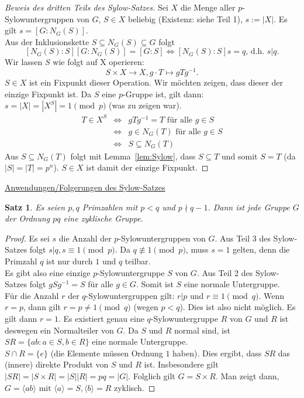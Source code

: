 \documentclass[12pt]{scrartcl}%
\newtheorem{thm}{Satz}
\theoremstyle{definition}
\theoremstyle{remark}
\begin{document}
\begin{proof}[Beweis des dritten Teils des Sylow-Satzes]
	Sei $X$ die Menge aller $p$-Sylowuntergruppen von $G$, $S \in X$ beliebig (Existenz: siehe Teil 1), $s := |X|$. Es gilt $s = [G:N_G(S)]$. \\
	Aus der Inklusionskette $S \subseteq N_G(S) \subseteq G$ folgt
	$$[N_G(S):S] [G:N_G(S)] = [G:S] \Leftrightarrow [N_G(S):S] s = q \text{, d.h. } s | q.$$
	Wir lassen $S$ wie folgt auf X operieren:
	$$S \times X \rightarrow X, g \cdot T \mapsto gTg^{-1}.$$
	$S \in X$ ist ein Fixpunkt dieser Operation. Wir möchten zeigen, dass dieser der einzige Fixpunkt ist. Da $S$ eine $p$-Gruppe ist, gilt dann: $s = |X| = |X^S| = 1 \pmod{p}$ (was zu zeigen war).
	\begin{align*}
		T \in X^S &\Leftrightarrow &gTg^{-1} = T \text{ für alle } g \in S \\
		&\Leftrightarrow &g \in N_G(T) \text{ für alle } g \in S \\
		&\Leftrightarrow &S \subseteq N_G(T)
	\end{align*}
	Aus $S \subseteq N_G(T)$ folgt mit Lemma~\ref{lem:Sylow}, dass $S \subseteq T$ und somit $S = T$ (da $|S| = |T| = p^n$). $S \in X$ ist damit der einzige Fixpunkt.
\end{proof}

\underline{Anwendungen/Folgerungen des Sylow-Satzes}

\begin{thm}
	Es seien $p, q$ Primzahlen mit $p < q$ und $p \nmid q-1$. Dann ist jede Gruppe $G$ der Ordnung $pq$ eine zyklische Gruppe.
\end{thm}

\begin{proof}
	Es sei $s$ die Anzahl der $p$-Sylowuntergruppen von $G$. Aus Teil 3 des Sylow-Satzes folgt $s | q, s \equiv 1 \pmod{p}$. Da $q \not \equiv 1 \pmod{p}$, muss $s = 1$ gelten, denn die Primzahl $q$ ist nur durch $1$ und $q$ teilbar. \\
	Es gibt also eine einzige $p$-Sylowuntergruppe $S$ von $G$. Aus Teil 2 des Sylow-Satzes folgt $gSg^{-1} = S$ für alle $g \in G$. Somit ist $S$ eine normale Untergruppe. \\
	Für die Anzahl $r$ der $q$-Sylowuntergruppen gilt: $r | p$ und $r \equiv 1 \pmod{q}$. Wenn $r = p$, dann gilt $r = p \not = 1 \pmod{q}$ (wegen $p < q$). Dies ist also nicht möglich. Es gilt dann $r = 1$. Es existiert genau eine $q$-Sylowuntergruppe $R$ von $G$ und $R$ ist deswegen ein Normalteiler von $G$. Da $S$ und $R$ normal sind, ist $SR = \{ ab : a \in S, b \in R\}$ eine normale Untergruppe. \\
	$S \cap R = \{ e\}$ (die Elemente müssen Ordnung $1$ haben). Dies ergibt, dass $SR$ das (innere) direkte Produkt von $S$ und $R$ ist. Insbesondere gilt $|SR| = |S \times R| = |S||R| = pq = |G|$. Folglich gilt $G = S \times R$. Man zeigt dann, $G = \langle ab \rangle \text{ mit } \langle a \rangle = S, \langle b \rangle = R$ zyklisch.
\end{proof}
\end{document}
